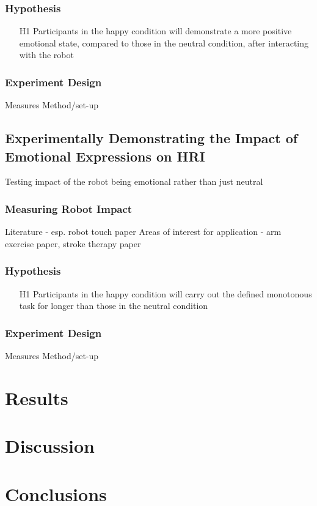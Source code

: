 \documentclass[11pt,a4paper]{report}
\begin{document}
\subsection{Hypothesis}
\begin{itemize}
	\item[H1] Participants in the happy condition will demonstrate a more positive emotional state, compared to those in the neutral condition, after interacting with the robot
\end{itemize}
\subsection{Experiment Design}
Measures
Method/set-up

\section{Experimentally Demonstrating the Impact of Emotional Expressions on HRI}
Testing impact of the robot being emotional rather than just neutral
\subsection{Measuring Robot Impact}
Literature - esp. robot touch paper
Areas of interest for application - arm exercise paper, stroke therapy paper
\subsection{Hypothesis}
\begin{itemize}
	\item[H1] Participants in the happy condition will carry out the defined monotonous task for longer than those in the neutral condition
\end{itemize}
\subsection{Experiment Design}
Measures
Method/set-up

\chapter{Results}

\chapter{Discussion}

\chapter{Conclusions}



\end{document}
